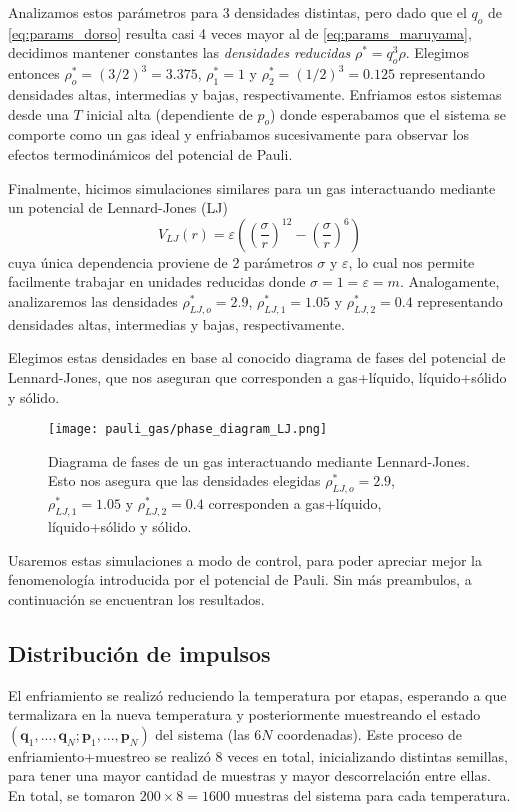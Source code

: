 Analizamos estos parámetros para 3 densidades distintas, pero dado que el $q_o$ de \eqref{eq:params_dorso} resulta casi 4 veces mayor al de \eqref{eq:params_maruyama}, decidimos mantener
constantes las \textit{densidades reducidas} $\rho^* = q_o^3\rho$.
Elegimos entonces $\rho_o^* = (3/2)^3 = 3.375 $, $\rho_1^* = 1 $ y $\rho_2^* = (1/2)^3 = 0.125 $ representando densidades altas, intermedias y bajas, respectivamente.
Enfriamos estos sistemas desde una $T$ inicial alta (dependiente de $p_o$) donde esperabamos que el sistema se comporte como un gas ideal y enfriabamos sucesivamente para observar los
efectos termodinámicos del potencial de Pauli.

Finalmente, hicimos simulaciones similares para un gas interactuando mediante un potencial de Lennard-Jones (LJ)
\[ V_{LJ}(r) = \varepsilon\left( \left( \frac{\sigma}{r} \right)^{12} - \left( \frac{\sigma}{r} \right)^6 \right) \]
cuya única dependencia proviene de 2 parámetros $\sigma$ y $\varepsilon$, lo cual nos permite facilmente trabajar en unidades reducidas donde $\sigma=1=\varepsilon=m$.
Analogamente, analizaremos las densidades $\rho_{LJ,o}^* = 2.9$, $\rho_{LJ,1}^* = 1.05$ y $\rho_{LJ,2}^* = 0.4$ representando densidades altas, intermedias y bajas, respectivamente.

Elegimos estas densidades en base al conocido diagrama de fases del potencial de Lennard-Jones, que nos aseguran que corresponden a gas+líquido, líquido+sólido y sólido.

\begin{figure}[h]
	\centering
	\texttt{[image: pauli\_gas/phase\_diagram\_LJ.png]}
	\caption{Diagrama de fases de un gas interactuando mediante Lennard-Jones. 
	Esto nos asegura que las densidades elegidas $\rho_{LJ,o}^* = 2.9$, $\rho_{LJ,1}^* = 1.05$ y $\rho_{LJ,2}^* = 0.4$ corresponden a gas+líquido, líquido+sólido y sólido.}
	\label{fig:ej_diag_fases}
\end{figure}

Usaremos estas simulaciones a modo de control, para poder apreciar mejor la fenomenología introducida por el potencial de Pauli.
Sin más preambulos, a continuación se encuentran los resultados.


\subsection{Distribución de impulsos}

El enfriamiento se realizó reduciendo la temperatura por etapas, esperando a que termalizara en la nueva temperatura y posteriormente muestreando el estado 
$(\mathbf{q}_1, ..., \mathbf{q}_N;\mathbf{p}_1, ..., \mathbf{p}_N)$ del sistema (las $6N$ coordenadas).
Este proceso de enfriamiento+muestreo se realizó 8 veces en total, inicializando distintas semillas, para tener una mayor cantidad de muestras y mayor descorrelación entre ellas.
En total, se tomaron $200\times 8 = 1600$ muestras del sistema para cada temperatura.

